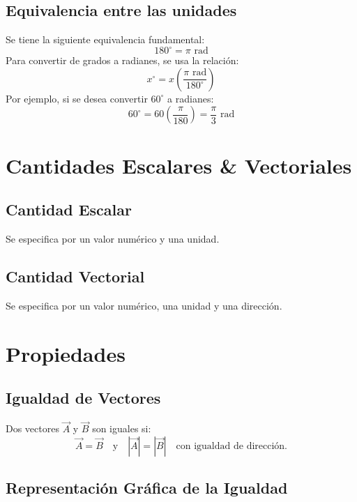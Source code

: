 \subsection{Equivalencia entre las unidades}
Se tiene la siguiente equivalencia fundamental:
\[
    180^{\circ} = \pi \text{ rad}
\]
Para convertir de grados a radianes, se usa la relación:
\[
x^{\circ} = x \left( \frac{\pi \text{ rad}}{180^{\circ}} \right)
\]
Por ejemplo, si se desea convertir $60^{\circ}$ a radianes:
\[
60^{\circ} = 60 \left( \frac{\pi}{180} \right) = \frac{\pi}{3} \text{ rad}\]

\newpage
\section{Cantidades Escalares \& Vectoriales}

\subsection{Cantidad Escalar}
Se especifica por un valor numérico y una unidad.

\subsection{Cantidad Vectorial}
Se especifica por un valor numérico, una unidad y una dirección.

\section{Propiedades}

\subsection{Igualdad de Vectores}
Dos vectores $\vec{A}$ y $\vec{B}$ son iguales si:
\[
    \vec{A} = \vec{B} \quad \text{y} \quad |\vec{A}| = |\vec{B}| \quad \text{con igualdad de dirección.}
\]

\subsection{Representación Gráfica de la Igualdad}
\begin{center}
\end{center}

